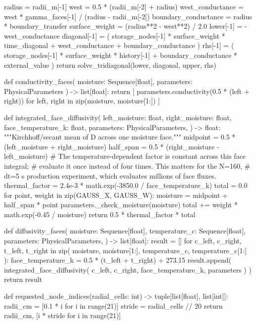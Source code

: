 \documentclass[withoutpreface,bwprint]{cumcmthesis}
\begin{document}
\begin{PythonCode}
    radius = radii_m[-1]
    west = 0.5 * (radii_m[-2] + radius)
    west_conductance = west * gamma_faces[-1] / (radius - radii_m[-2])
    boundary_conductance = radius * boundary_transfer
    surface_weight = (radius**2 - west**2) / 2.0
    lower[-1] = -west_conductance
    diagonal[-1] = (
        storage_nodes[-1] * surface_weight * time_diagonal
        + west_conductance
        + boundary_conductance
    )
    rhs[-1] = (
        storage_nodes[-1] * surface_weight * history[-1]
        + boundary_conductance * external_value
    )
    return solve_tridiagonal(lower, diagonal, upper, rhs)


def conductivity_faces(
    moisture: Sequence[float], parameters: PhysicalParameters
) -> list[float]:
    return [
        parameters.conductivity(0.5 * (left + right))
        for left, right in zip(moisture, moisture[1:])
    ]


def integrated_face_diffusivity(
    left_moisture: float,
    right_moisture: float,
    face_temperature_k: float,
    parameters: PhysicalParameters,
) -> float:
    """Kirchhoff/secant mean of D across one moisture face."""
    midpoint = 0.5 * (left_moisture + right_moisture)
    half_span = 0.5 * (right_moisture - left_moisture)
    # The temperature-dependent factor is constant across this face integral;
    # evaluate it once instead of four times.  This matters for the N=160,
    # dt=5 s production experiment, which evaluates millions of face fluxes.
    thermal_factor = 2.4e-3 * math.exp(-3850.0 / face_temperature_k)
    total = 0.0
    for point, weight in zip(GAUSS_X, GAUSS_W):
        moisture = midpoint + half_span * point
        parameters._check_moisture(moisture)
        total += weight * math.exp(-0.45 / moisture)
    return 0.5 * thermal_factor * total


def diffusivity_faces(
    moisture: Sequence[float],
    temperature_c: Sequence[float],
    parameters: PhysicalParameters,
) -> list[float]:
    result = []
    for c_left, c_right, t_left, t_right in zip(
        moisture, moisture[1:], temperature_c, temperature_c[1:]
    ):
        face_temperature_k = 0.5 * (t_left + t_right) + 273.15
        result.append(
            integrated_face_diffusivity(
                c_left, c_right, face_temperature_k, parameters
            )
        )
    return result


def requested_node_indices(radial_cells: int) -> tuple[list[float], list[int]]:
    radii_cm = [0.1 * i for i in range(21)]
    stride = radial_cells // 20
    return radii_cm, [i * stride for i in range(21)]



\end{PythonCode}
\end{document}

